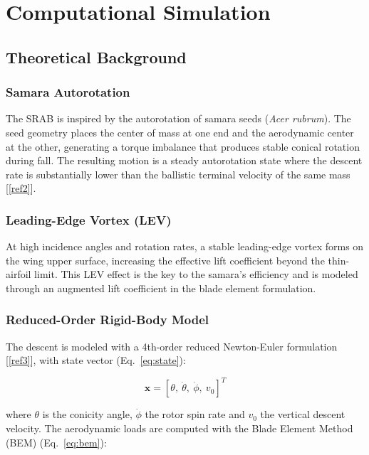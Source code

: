 \section{Computational Simulation}

\subsection{Theoretical Background}

\subsubsection{Samara Autorotation}

The SRAB is inspired by the autorotation of samara seeds (\emph{Acer
rubrum}). The seed geometry places the center of mass at one end and
the aerodynamic center at the other, generating a torque imbalance
that produces stable conical rotation during fall. The resulting
motion is a steady autorotation state where the descent rate is
substantially lower than the ballistic terminal velocity of the same
mass [\ref{ref2}].

\subsubsection{Leading-Edge Vortex (LEV)}

At high incidence angles and rotation rates, a stable leading-edge
vortex forms on the wing upper surface, increasing the effective lift
coefficient beyond the thin-airfoil limit. This LEV effect is the key
to the samara's efficiency and is modeled through an augmented lift
coefficient in the blade element formulation.

\subsubsection{Reduced-Order Rigid-Body Model}

The descent is modeled with a 4th-order reduced Newton-Euler
formulation [\ref{ref3}], with state vector (Eq.~\ref{eq:state}):

\begin{equation}
\mathbf{x} = [\theta,\ \dot{\theta},\ \dot{\phi},\ v_0]^T
\label{eq:state}
\end{equation}

where $\theta$ is the conicity angle, $\dot{\phi}$ the rotor spin rate
and $v_0$ the vertical descent velocity. The aerodynamic loads are
computed with the Blade Element Method (BEM) (Eq.~\ref{eq:bem}):

